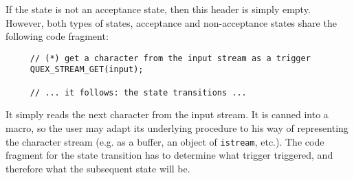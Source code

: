 If the state is not an acceptance state, then this header is simply empty.
However, both types of states, acceptance and non-acceptance states share
the following code fragment:

\begin{lstlisting}
     // (*) get a character from the input stream as a trigger
     QUEX_STREAM_GET(input);
     
     // ... it follows: the state transitions ...
\end{lstlisting}

It simply reads the next character from the input stream. It is canned into
a macro, so the user may adapt its underlying procedure to his way of representing
the character stream (e.g. as a buffer, an object of {\tt istream}, etc.).
The code fragment for the state transition has to determine what trigger 
triggered, and therefore what the subsequent state will be.


